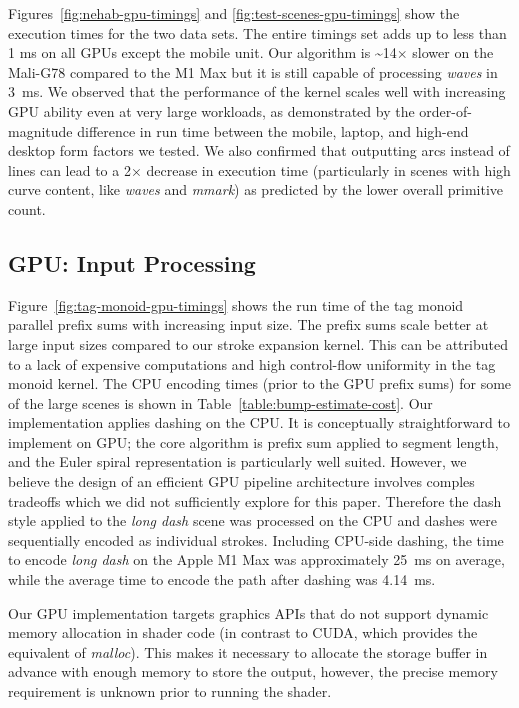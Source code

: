 \documentclass[sigconf, nonacm]{acmart}
\begin{document}
Figures~\ref{fig:nehab-gpu-timings} and \ref{fig:test-scenes-gpu-timings} show the execution times for the two data sets. The entire \citet{Nehab2020} timings set adds up to less than 1 ms on all GPUs except the mobile unit. Our algorithm is \textasciitilde14$\times$ slower on the Mali-G78 compared to the M1 Max but it is still capable of processing \emph{waves} in 3~ms. We observed that the performance of the kernel scales well with increasing GPU ability even at very large workloads, as demonstrated by the order-of-magnitude difference in run time between the mobile, laptop, and high-end desktop form factors we tested. We also confirmed that outputting arcs instead of lines can lead to a 2$\times$ decrease in execution time (particularly in scenes with high curve content, like \emph{waves} and \emph{mmark}) as predicted by the lower overall primitive count.

\subsection{GPU: Input Processing} \label{subsection:encoding-results}

Figure~\ref{fig:tag-monoid-gpu-timings} shows the run time of the tag monoid parallel prefix sums with increasing input size. The prefix sums scale better at large input sizes compared to our stroke expansion kernel. This can be attributed to a lack of expensive computations and high control-flow uniformity in the tag monoid kernel. The CPU encoding times (prior to the GPU prefix sums) for some of the large scenes is shown in Table~\ref{table:bump-estimate-cost}. Our implementation applies dashing on the CPU. It is conceptually straightforward to implement on GPU; the core algorithm is prefix sum applied to segment length, and the Euler spiral representation is particularly well suited. However, we believe the design of an efficient GPU pipeline architecture involves comples tradeoffs which we did not sufficiently explore for this paper. Therefore the dash style applied to the \emph{long dash} scene was processed on the CPU and dashes were sequentially encoded as individual strokes. Including CPU-side dashing, the time to encode \emph{long dash} on the Apple M1 Max was approximately 25~ms on average, while the average time to encode the path after dashing was 4.14~ms.

Our GPU implementation targets graphics APIs that do not support dynamic memory allocation in shader code (in contrast to CUDA, which provides the equivalent of \emph{malloc}). This makes it necessary to allocate the storage buffer in advance with enough memory to store the output, however, the precise memory requirement is unknown prior to running the shader.
\end{document}
